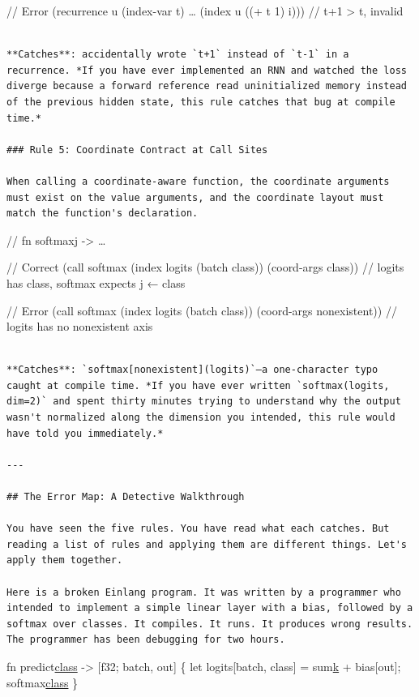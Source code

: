 \documentclass[11pt,titlepage]{article}
\begin{document}
// Error (recurrence u (index-var t) \ldots{} (index u ((+ t 1) i))) //
t+1 \textgreater{} t, invalid

\begin{verbatim}

**Catches**: accidentally wrote `t+1` instead of `t-1` in a recurrence. *If you have ever implemented an RNN and watched the loss diverge because a forward reference read uninitialized memory instead of the previous hidden state, this rule catches that bug at compile time.*

### Rule 5: Coordinate Contract at Call Sites

When calling a coordinate-aware function, the coordinate arguments must exist on the value arguments, and the coordinate layout must match the function's declaration.
\end{verbatim}

// fn softmax\href{x:\%20\%5Bf32;\%20..left,\%20j,\%20..right\%5D}{j}
-\textgreater{} \ldots{}

// Correct (call softmax (index logits (batch class)) (coord-args
class)) // logits has class, softmax expects j ← class

// Error (call softmax (index logits (batch class)) (coord-args
nonexistent)) // logits has no nonexistent axis

\begin{verbatim}

**Catches**: `softmax[nonexistent](logits)`—a one-character typo caught at compile time. *If you have ever written `softmax(logits, dim=2)` and spent thirty minutes trying to understand why the output wasn't normalized along the dimension you intended, this rule would have told you immediately.*

---

## The Error Map: A Detective Walkthrough

You have seen the five rules. You have read what each catches. But reading a list of rules and applying them are different things. Let's apply them together.

Here is a broken Einlang program. It was written by a programmer who intended to implement a simple linear layer with a bias, followed by a softmax over classes. It compiles. It runs. It produces wrong results. The programmer has been debugging for two hours.
\end{verbatim}

fn
predict\href{x:\%20\%5Bf32;\%20batch,\%20in\%5D,\%20W:\%20\%5Bf32;\%20out,\%20in\%5D,\%20bias:\%20\%5Bf32;\%20out\%5D}{class}
-\textgreater{} {[}f32; batch, out{]} \{ let logits{[}batch, class{]} =
sum\href{x\%5Bbatch,\%20k\%5D\%20*\%20W\%5Bout,\%20k\%5D}{k} +
bias{[}out{]}; softmax\href{logits\%5Bbatch,\%20class\%5D}{class} \}
\end{document}
